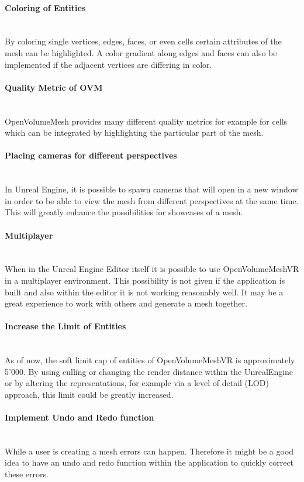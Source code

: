 \documentclass{report}
\begin{document}
	\paragraph{Coloring of Entities} \hfill \\
	By coloring single vertices, edges, faces, or even cells certain attributes of the mesh can be highlighted. A color gradient along edges and faces can also be implemented if the adjacent vertices are differing in color.
	\paragraph{Quality Metric of OVM} \hfill \\
	OpenVolumeMesh provides many different quality metrics for example for cells which can be integrated by highlighting the particular part of the mesh.
	\paragraph{Placing cameras for different perspectives} \hfill \\
	In Unreal Engine, it is possible to spawn cameras that will open in a new window in order to be able to view the mesh from different perspectives at the same time. This will greatly enhance the possibilities for showcases of a mesh.
	\paragraph{Multiplayer} \hfill \\
	When in the Unreal Engine Editor itself it is possible to use OpenVolumeMeshVR in a multiplayer environment. This possibility is not given if the application is built and also within the editor it is not working reasonably well. It may be a great experience to work with others and generate a mesh together.
	\paragraph{Increase the Limit of Entities} \hfill \\
	As of now, the soft limit cap of entities of OpenVolumeMeshVR is approximately 5'000. By using culling or changing the render distance within the UnrealEngine or by altering the representations, for example via a level of detail (LOD) approach, this limit could be greatly increased.
	\paragraph{Implement Undo and Redo function} \hfill \\
	While a user is creating a mesh errors can happen. Therefore it might be a good idea to have an undo and redo function within the application to quickly correct these errors.	
\end{document}
